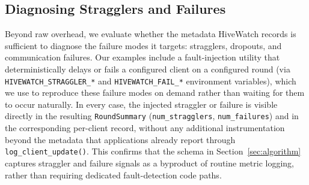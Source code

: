\subsection{Diagnosing Stragglers and Failures}
\label{subsec:fault}

Beyond raw overhead, we evaluate whether the metadata HiveWatch records is sufficient to diagnose the failure modes it targets: stragglers, dropouts, and communication failures. Our examples include a fault-injection utility that deterministically delays or fails a configured client on a configured round (via \texttt{HIVEWATCH\_STRAGGLER\_*} and \texttt{HIVEWATCH\_FAIL\_*} environment variables), which we use to reproduce these failure modes on demand rather than waiting for them to occur naturally. In every case, the injected straggler or failure is visible directly in the resulting \texttt{RoundSummary} (\texttt{num\_stragglers}, \texttt{num\_failures}) and in the corresponding per-client record, without any additional instrumentation beyond the metadata that applications already report through \texttt{log\_client\_update()}. This confirms that the schema in Section~\ref{sec:algorithm} captures straggler and failure signals as a byproduct of routine metric logging, rather than requiring dedicated fault-detection code paths.
